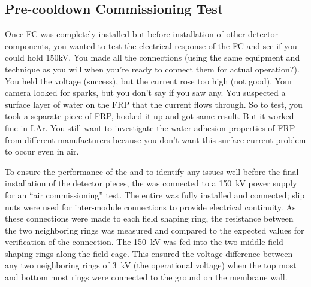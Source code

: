 

\subsection{Pre-cooldown Commissioning Test}
\label{sec:fddp-hv-protodune-air}

Once FC was completely installed but before installation of other detector components, you wanted to test the electrical response of the FC and see if you could hold 150kV.  
You made all the connections (using the same equipment and technique as you will when you're ready to connect them for actual operation?). You held the voltage (success), but the current rose too high (not good). Your camera looked for sparks, but you don't say if you saw any. You suspected a surface layer of water on the FRP that the current flows through. So to test, you took a separate piece of FRP, hooked it up and got same result. But it worked fine in LAr.  You still want to investigate the water adhesion properties of FRP from different manufacturers because you don't want this surface current problem to occur even in air.


To ensure the performance of the  and to identify any issues well before the final installation of the detector pieces, the   was connected to a \SI{150}{\kV} power supply for an ``air commissioning'' test. The entire  was fully installed and connected; slip nuts were used for inter-module connections to provide electrical continuity. 
As these connections were made to each %
field shaping ring, 
the resistance between  the two neighboring rings was measured and compared to the expected values for verification of the connection.
The \SI{150}{\kV}  was fed into the two middle field-shaping rings along the field cage. This ensured 
 the voltage difference between any two neighboring rings of \SI{3}{\kV} (the operational voltage) when the top most and bottom most rings were connected to the ground on the membrane wall.

